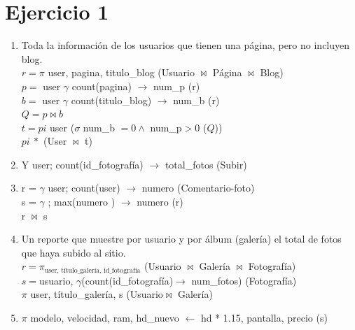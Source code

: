 \documentclass[a4paper, 12pt]{report}
\begin{document}
\section*{Ejercicio 1}{
\begin{enumerate}[label=\alph*)]
\item{Toda la información de los usuarios que tienen una página, pero no
        incluyen blog.\\
    $r = \pi$ user,  pagina, titulo\_blog (Usuario $\Join$ Página $\Join$ Blog)\\
    $p = $ user $\gamma$ count(pagina) $\rightarrow$ num\_p (r)\\
    $b = $ user $\gamma$ count(titulo\_blog) $\rightarrow$ num\_b (r)\\
    $Q = p \Join b$\\
    $t =pi$ user ($\sigma$ num\_b $= 0 \wedge$ num\_p$ > 0$ ($Q$))\\
    $pi\ *$ (User $\Join$ t)
    }
\item{Y user; count(id\_fotografía) $\rightarrow$ total\_fotos (Subir)\\}
\item{r = $\gamma$ user; count(user) $\rightarrow$ numero (Comentario-foto)\\
      s = $\gamma$ ; max(numero ) $\rightarrow$ numero (r)\\
      r $\Join$ s
}
\item{Un reporte que muestre por usuario y por álbum (galería) el total de fotos
        que haya subido al sitio.\\
    $r = \pi_{\text{user, título\_galería, id\_fotografía}}$ (Usuario $\Join$
        Galería $\Join$ Fotografía)\\
    $s =$usuario,  $\gamma$(count(id\_fotografía)$\rightarrow$ num\_fotos)
        (Fotografía)\\
    $\pi $ user, título\_galería, s (Usuario$\Join$ Galería)
}
\item{$\pi$ modelo, velocidad, ram, hd\_nuevo $\leftarrow$
        hd * 1.15, pantalla, precio (s)\\
}
\end{enumerate}
}
\end{document}
